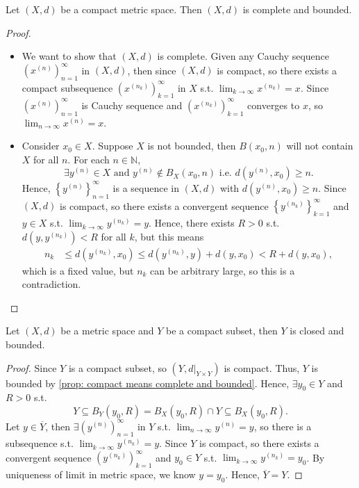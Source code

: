 \begin{proposition} \label{prop: compact means complete and bounded}
    Let \((X, d)\) be a compact metric space. Then \((X, d)\) is complete and bounded.  
\end{proposition}
\begin{proof}
    \vphantom{text}
    \begin{itemize}
        \item We want to show that \((X, d)\) is complete. Given any Cauchy sequence \(\left( x^{(n)} \right)_{n=1}^{\infty}  \)  in \((X, d)\), then since \((X, d)\) is compact, so there exists a compact subsequence \(\left( x^{(n_k)} \right)_{k=1}^{\infty}  \) in \(X\) s.t. \(\lim_{k \to \infty} x^{(n_k)} = x \). Since \(\left( x^{(n)} \right)_{n=1}^{\infty}  \) is Cauchy sequence and \(\left( x^{(n_k)} \right)_{k=1}^{\infty}  \) converges to \(x\), so \(\lim_{n \to \infty} x^{(n)} = x \).   
        \item Consider \(x_0 \in X\). Suppose \(X\) is not bounded, then \(B(x_0, n)\) will not contain \(X\) for all \(n\). For each \(n \in \mathbb{N} \),
        \[
            \exists y^{(n)} \in X \text{ and } y^{(n)} \notin B_X(x_0, n) \text{ i.e. } d\left( y^{(n)}, x_0 \right) \ge n. 
        \]
        Hence, \(\left\{ y^{(n)} \right\}_{n=1}^{\infty}  \) is a sequence in \((X, d)\) with \(d\left( y^{(n)}, x_0\right) \ge n \). Since \((X, d)\) is compact, so there exists a convergent sequence \(\left\{ y^{(n_k)} \right\}_{k=1}^{\infty}  \) and \(y \in X\) s.t. \(\lim_{k \to \infty} y^{(n_k)} = y \). Hence, there exists \(R > 0\) s.t. \(d\left( y, y^{(n_k)} \right) < R \) for all \(k\), but this means 
        \begin{align*}
            n_k &\le d\left( y^{(n_k)}, x_0 \right) \le d\left( y^{(n_k)}, y \right) + d(y, x_0) < R + d(y, x_0),  
        \end{align*}  which is a fixed value, but \(n_k\) can be arbitrary large, so this is a contradiction.       
    \end{itemize}
\end{proof}

\begin{corollary}
    Let \((X, d)\) be a metric space and \(Y\) be a compact subset, then \(Y\) is closed and bounded.    
\end{corollary}
\begin{proof}
    Since \(Y\) is a compact subset, so \(\left( Y, d\vert_{Y \times Y} \right) \) is compact. Thus, \(Y\) is bounded by  \autoref{prop: compact means complete and bounded}. Hence, \(\exists y_0 \in Y\) and \(R > 0\) s.t. 
    \[
        Y \subseteq B_Y(y_0, R) =  B_X(y_0, R) \cap Y \subseteq B_X(y_0, R).
    \]   
    Let \(y \in \overline{Y} \), then \(\exists \left( y^{(n)} \right)_{n=1}^{\infty}  \) in \(Y\) s.t. \(\lim_{n \to \infty} y^{(n)} = y \), so there is a subsequence s.t. \(\lim_{k \to \infty} y^{(n_k)} = y \). Since \(Y\) is compact, so there exists a convergent sequence \(\left( y^{(n_k)} \right)_{k=1}^{\infty } \) and \(y_0 \in Y\)  s.t. \(\lim_{k \to \infty}  y^{(n_k)}= y_0 \). By uniqueness of limit in metric space, we know \(y = y_0\). Hence, \(\overline{Y} = Y \).     
\end{proof}

